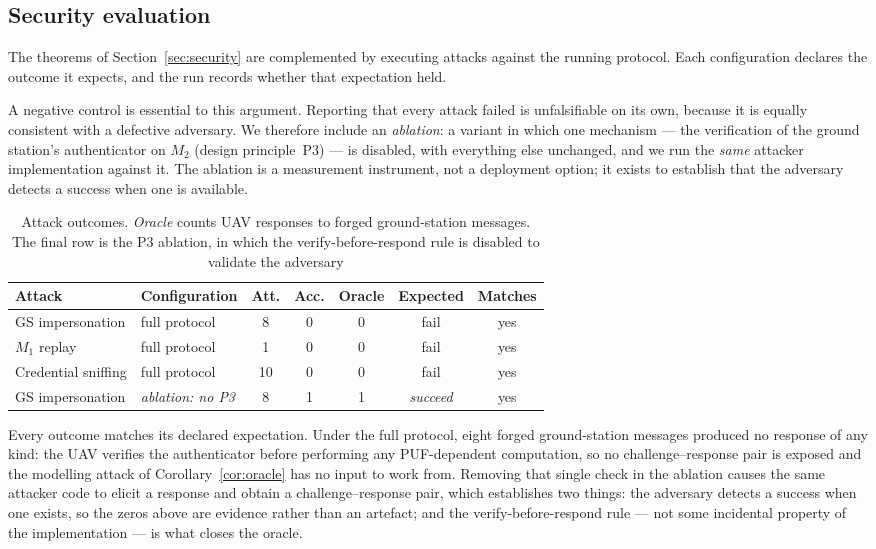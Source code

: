 \documentclass[11pt,a4paper]{article}
\begin{document}
\subsection{Security evaluation}
\label{subsec:security_eval}

The theorems of Section~\ref{sec:security} are complemented by executing attacks
against the running protocol. Each configuration declares the outcome it expects,
and the run records whether that expectation held.

A negative control is essential to this argument. Reporting that every attack
failed is unfalsifiable on its own, because it is equally consistent with a
defective adversary. We therefore include an \emph{ablation}: a variant in which
one mechanism --- the verification of the ground station's authenticator on $M_2$
(design principle~P3) --- is disabled, with everything else unchanged, and we run
the \emph{same} attacker implementation against it. The ablation is a measurement
instrument, not a deployment option; it exists to establish that the adversary
detects a success when one is available.

\begin{table}[H]
\centering
\caption{Attack outcomes. \emph{Oracle} counts UAV responses to forged
ground-station messages. The final row is the P3 ablation, in which the
verify-before-respond rule is disabled to validate the adversary}
\label{tab:attacks}
\small
\begin{tabular}{@{}llccccc@{}}
\toprule
\textbf{Attack} & \textbf{Configuration} & \textbf{Att.} & \textbf{Acc.} &
\textbf{Oracle} & \textbf{Expected} & \textbf{Matches} \\
\midrule
GS impersonation & full protocol & 8 & 0 & 0 & fail & yes \\
$M_1$ replay & full protocol & 1 & 0 & 0 & fail & yes \\
Credential sniffing & full protocol & 10 & 0 & 0 & fail & yes \\
\midrule
GS impersonation & \emph{ablation: no P3} & 8 & 1 & 1 & \emph{succeed} & yes \\
\bottomrule
\end{tabular}
\end{table}

Every outcome matches its declared expectation. Under the full protocol, eight
forged ground-station messages produced no response of any kind: the UAV verifies
the authenticator before performing any PUF-dependent computation, so no
challenge--response pair is exposed and the modelling attack of
Corollary~\ref{cor:oracle} has no input to work from. Removing that single check in
the ablation causes the same attacker code to elicit a response and obtain a
challenge--response pair, which establishes two things: the adversary detects a
success when one exists, so the zeros above are evidence rather than an artefact;
and the verify-before-respond rule --- not some incidental property of the
implementation --- is what closes the oracle.
\end{document}
